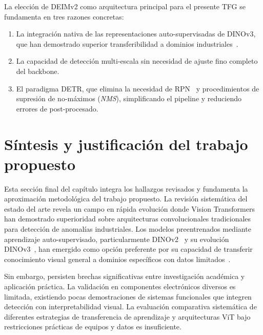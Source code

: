 La elección de DEIMv2 como arquitectura principal para el presente TFG se fundamenta en tres razones concretas:
\begin{enumerate}
    \item La integración nativa de las representaciones auto-supervisadas de DINOv3, que han demostrado superior transferibilidad a dominios industriales~\cite{huang2025semiconductor}.
    \item La capacidad de detección multi-escala sin necesidad de ajuste fino completo del backbone.
    \item El paradigma DETR, que elimina la necesidad de \acrshort{RPN}~\cite{ren_faster_2016} y procedimientos de supresión de no-máximos (\textit{NMS}), simplificando el pipeline y reduciendo errores de post-procesado.
\end{enumerate}

\section{Síntesis y justificación del trabajo propuesto}

Esta sección final del capítulo integra los hallazgos revisados y fundamenta la aproximación metodológica del trabajo propuesto. La revisión sistemática del estado del arte revela un campo en rápida evolución donde Vision Transformers han demostrado superioridad sobre arquitecturas convolucionales tradicionales para detección de anomalías industriales. Los modelos preentrenados mediante aprendizaje auto-supervisado, particularmente DINOv2~\cite{oquab2024dinov2} y su evolución DINOv3~\cite{simeoni2025dinov3}, han emergido como opción preferente por su capacidad de transferir conocimiento visual general a dominios específicos con datos limitados~\cite{huang2025semiconductor,legia2025consistent,khan2024survey}.

Sin embargo, persisten brechas significativas entre investigación académica y aplicación práctica. La validación en componentes electrónicos diversos es limitada, existiendo pocas demostraciones de sistemas funcionales que integren detección con interpretabilidad visual. La evaluación comparativa sistemática de diferentes estrategias de transferencia de aprendizaje y arquitecturas ViT bajo restricciones prácticas de equipos y datos es insuficiente.

